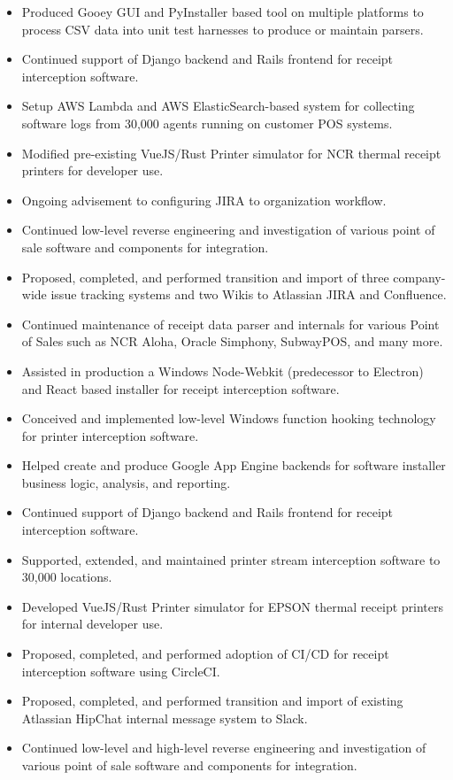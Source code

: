 \documentclass[10pt,letter,ragged2e]{altacv}
\begin{document}
\begin{paracol}{2}
\begin{itemize}
\item Produced Gooey GUI and PyInstaller based tool on multiple platforms to process CSV data into unit test harnesses to produce or maintain parsers.
\item Continued support of Django backend and Rails frontend for receipt interception software.
\item Setup AWS Lambda and AWS ElasticSearch-based system for collecting software logs from 30,000 agents running on customer POS systems.
\item Modified pre-existing VueJS/Rust Printer simulator for NCR thermal receipt printers for developer use.
\item Ongoing advisement to configuring JIRA to organization workflow.
\item Continued low-level reverse engineering and investigation of various point of sale software and components for integration.
\end{itemize}

\divider


\begin{itemize}
\item Proposed, completed, and performed transition and import of three company-wide issue tracking systems and two Wikis to Atlassian JIRA and Confluence.
\item Continued maintenance of receipt data parser and internals for various Point of Sales such as NCR Aloha, Oracle Simphony, SubwayPOS, and many more.
\item Assisted in production a Windows Node-Webkit (predecessor to Electron) and React based installer for receipt interception software.
\item Conceived and implemented low-level Windows function hooking technology for printer interception software.
\item Helped create and produce Google App Engine backends for software installer business logic, analysis, and reporting.
\item Continued support of Django backend and Rails frontend for receipt interception software.
\item Supported, extended, and maintained printer stream interception software to 30,000 locations.
\item Developed VueJS/Rust Printer simulator for EPSON thermal receipt printers for internal developer use.
\item Proposed, completed, and performed adoption of CI/CD for receipt interception software using CircleCI.
\item Proposed, completed, and performed transition and import of existing Atlassian HipChat internal message system to Slack.
\item Continued low-level and high-level reverse engineering and investigation of various point of sale software and components for integration.
\end{itemize}


\end{paracol}
\end{document}
